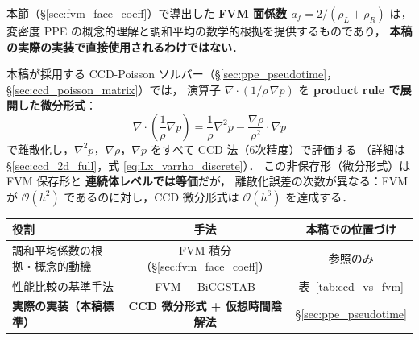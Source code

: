 \begin{tcolorbox}[warnbox, title={重要：FVM 離散化（§\ref{sec:fvm_face_coeff}）と CCD 実装（§\ref{sec:ppe_pseudotime}）の役割分担}]
\label{warn:fvm_vs_ccd}
本節（§\ref{sec:fvm_face_coeff}）で導出した \textbf{FVM 面係数 $a_f = 2/(\rho_L+\rho_R)$} は，
変密度 PPE の概念的理解と調和平均の数学的根拠を提供するものであり，
\textbf{本稿の実際の実装で直接使用されるわけではない}．

本稿が採用する CCD-Poisson ソルバー（§\ref{sec:ppe_pseudotime}，§\ref{sec:ccd_poisson_matrix}）では，
演算子 $\nabla\cdot(1/\rho\,\nabla p)$ を \textbf{product rule で展開した微分形式}：
\begin{equation}
  \nabla\cdot\!\left(\frac{1}{\rho}\nabla p\right)
  = \frac{1}{\rho}\nabla^2 p - \frac{\nabla\rho}{\rho^2}\cdot\nabla p
  \label{eq:varrho_product_rule}
\end{equation}
で離散化し，$\nabla^2 p$，$\nabla\rho$，$\nabla p$ をすべて CCD 法（6次精度）で評価する
（詳細は§\ref{sec:ccd_2d_full}，式 \eqref{eq:Lx_varrho_discrete}）．
この非保存形（微分形式）は FVM 保存形と \textbf{連続体レベルでは等価}だが，
離散化誤差の次数が異なる：FVM が $\mathcal{O}(h^2)$ であるのに対し，CCD 微分形式は $\mathcal{O}(h^6)$ を達成する．

\begin{center}
\renewcommand{\arraystretch}{1.2}
\begin{tabular}{lcc}
\hline
役割 & 手法 & 本稿での位置づけ \\
\hline
調和平均係数の根拠・概念的動機 & FVM 積分（§\ref{sec:fvm_face_coeff}） & 参照のみ \\
性能比較の基準手法 & FVM + BiCGSTAB & 表~\ref{tab:ccd_vs_fvm} \\
\textbf{実際の実装（本稿標準）} & \textbf{CCD 微分形式 + 仮想時間陰解法} & §\ref{sec:ppe_pseudotime} \\
\hline
\end{tabular}
\end{center}
\end{tcolorbox}

